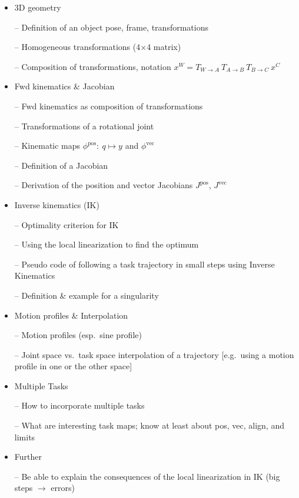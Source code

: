 \begin{itemize}
\item 3D geometry

-- Definition of an object pose, frame, transformations

-- Homogeneous transformations (4$\times$4 matrix)

-- Composition of transformations, notation $x^W = T_{W\to A}~ T_{A\to B}~ T_{B\to C}~ x^C$

\item Fwd kinematics \& Jacobian

-- Fwd kinematics as composition of transformations

-- Transformations of a rotational joint

-- Kinematic maps $\phi^\text{pos}:~ q \mapsto y$ and $\phi^\text{vec}$

-- Definition of a Jacobian

-- Derivation of the position and vector Jacobians $J^\text{pos}$,
$J^\text{vec}$

\item Inverse kinematics (IK)

-- Optimality criterion for IK

-- Using the local linearization to find the optimum

-- Pseudo code of following a task trajectory in small steps using Inverse Kinematics

-- Definition \& example for a singularity

\item Motion profiles \& Interpolation

-- Motion profiles (esp.\ sine profile)

-- Joint space vs.\ task space interpolation of a trajectory
[e.g.\ using a motion profile in one or the other space]

\item Multiple Tasks

-- How to incorporate multiple tasks

-- What are interesting task maps; know at least about pos, vec,
align, and limits

\item Further

-- Be able to explain the consequences of the local linearization in
IK (big steps $\to$ errors)

\end{itemize}

